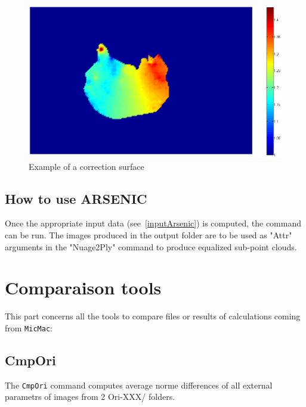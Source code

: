 \begin{figure}[H]
\centering
\includegraphics[width=15cm]{FIGS/Arsenic/SurfCorr.png}
\caption{Example of a correction surface}
\label{SurfCorr}
\end{figure}


\subsection{How to use ARSENIC}

Once the appropriate input data (see~\ref{inputArsenic}) is computed, the command can be run. The images produced in the output folder are to be used as "Attr" arguments in the "Nuage2Ply" command to produce equalized sub-point clouds.

\section{Comparaison tools}
This part concerns all the tools to compare files or results of calculations coming from {\tt MicMac}:

\subsection{CmpOri}
The {\tt CmpOri} command computes average norme differences of all external parametrs of images from 2 Ori-XXX/ folders.

